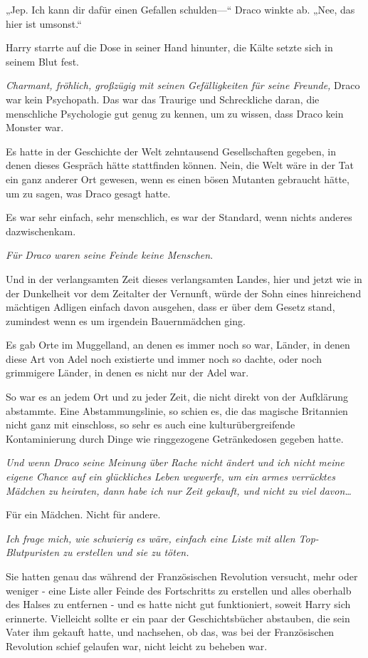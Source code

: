 {„Jep. Ich kann dir dafür einen Gefallen schulden—“ Draco winkte ab. „Nee, das hier ist umsonst.“

Harry starrte auf die Dose in seiner Hand hinunter, die Kälte setzte sich in seinem Blut fest.

\emph{Charmant, fröhlich, großzügig mit seinen Gefälligkeiten für seine Freunde,} Draco war kein Psychopath. Das war das Traurige und Schreckliche daran, die menschliche Psychologie gut genug zu kennen, um zu wissen, dass Draco kein Monster war.

Es hatte in der Geschichte der Welt zehntausend Gesellschaften gegeben, in denen dieses Gespräch hätte stattfinden können. Nein, die Welt wäre in der Tat ein ganz anderer Ort gewesen, wenn es einen bösen Mutanten gebraucht hätte, um zu sagen, was Draco gesagt hatte.

Es war sehr einfach, sehr menschlich, es war der Standard, wenn nichts anderes dazwischenkam.

\emph{Für Draco waren seine Feinde keine Menschen}.

Und in der verlangsamten Zeit dieses verlangsamten Landes, hier und jetzt wie in der Dunkelheit vor dem Zeitalter der Vernunft, würde der Sohn eines hinreichend mächtigen Adligen einfach davon ausgehen, dass er über dem Gesetz stand, zumindest wenn es um irgendein Bauernmädchen ging.

Es gab Orte im Muggelland, an denen es immer noch so war, Länder, in denen diese Art von Adel noch existierte und immer noch so dachte, oder noch grimmigere Länder, in denen es nicht nur der Adel war.

So war es an jedem Ort und zu jeder Zeit, die nicht direkt von der Aufklärung abstammte. Eine Abstammungslinie, so schien es, die das magische Britannien nicht ganz mit einschloss, so sehr es auch eine kulturübergreifende Kontaminierung durch Dinge wie ringgezogene Getränkedosen gegeben hatte.

\emph{Und wenn Draco seine Meinung über Rache nicht ändert und ich nicht meine eigene Chance auf ein glückliches Leben wegwerfe, um ein armes verrücktes Mädchen zu heiraten, dann habe ich nur Zeit gekauft, und nicht zu viel davon…}

Für ein Mädchen. Nicht für andere.

\emph{Ich frage mich, wie schwierig es wäre, einfach eine Liste mit allen Top-Blutpuristen zu erstellen und sie zu töten.}

Sie hatten genau das während der Französischen Revolution versucht, mehr oder weniger - eine Liste aller Feinde des Fortschritts zu erstellen und alles oberhalb des Halses zu entfernen - und es hatte nicht gut funktioniert, soweit Harry sich erinnerte. Vielleicht sollte er ein paar der Geschichtsbücher abstauben, die sein Vater ihm gekauft hatte, und nachsehen, ob das, was bei der Französischen Revolution schief gelaufen war, nicht leicht zu beheben war.

}
